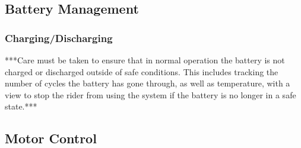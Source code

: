 \documentclass[journal,10pt]{IEEEtran}
\begin{document}
    \subsection{Battery Management}
    	\subsubsection{Charging/Discharging}
    	***Care must be taken to ensure that in normal operation the battery is not charged or discharged outside of safe conditions.
    	This includes tracking the number of cycles the battery has gone through, as well as temperature, with a view to stop the rider from using the system if the battery is no longer in a safe state.***
    	
    \subsection{Motor Control}
\end{document}
